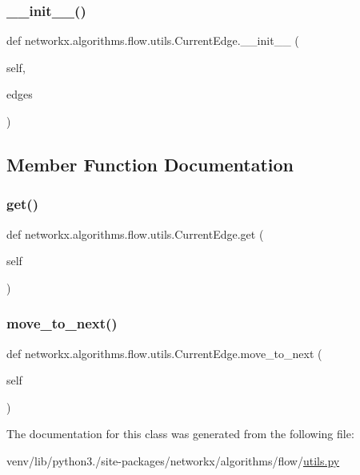 \subsubsection{\texorpdfstring{\+\_\+\+\_\+init\+\_\+\+\_\+()}{\_\_init\_\_()}}
{\footnotesize\ttfamily def networkx.\+algorithms.\+flow.\+utils.\+Current\+Edge.\+\_\+\+\_\+init\+\_\+\+\_\+ (\begin{DoxyParamCaption}\item[{}]{self,  }\item[{}]{edges }\end{DoxyParamCaption})}



\subsection{Member Function Documentation}
\mbox{\label{classnetworkx_1_1algorithms_1_1flow_1_1utils_1_1CurrentEdge_a21862bce8bcaa9aa5bcb464c477027e1}} 
\subsubsection{\texorpdfstring{get()}{get()}}
{\footnotesize\ttfamily def networkx.\+algorithms.\+flow.\+utils.\+Current\+Edge.\+get (\begin{DoxyParamCaption}\item[{}]{self }\end{DoxyParamCaption})}

\mbox{\label{classnetworkx_1_1algorithms_1_1flow_1_1utils_1_1CurrentEdge_af990dbef1c9e9d9ee97264619b41ff49}} 
\subsubsection{\texorpdfstring{move\+\_\+to\+\_\+next()}{move\_to\_next()}}
{\footnotesize\ttfamily def networkx.\+algorithms.\+flow.\+utils.\+Current\+Edge.\+move\+\_\+to\+\_\+next (\begin{DoxyParamCaption}\item[{}]{self }\end{DoxyParamCaption})}



The documentation for this class was generated from the following file\+:\begin{DoxyCompactItemize}
\item 
venv/lib/python3./site-\/packages/networkx/algorithms/flow/\hyperlink{networkx_2algorithms_2flow_2utils_8py}{utils.\+py}\end{DoxyCompactItemize}
